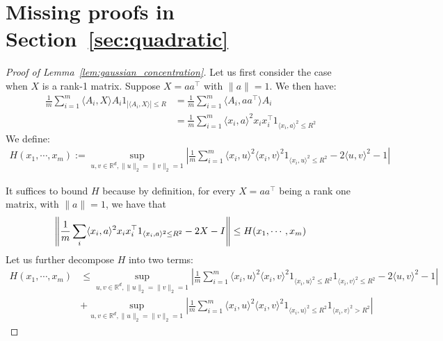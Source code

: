 \section{Missing proofs in Section~\ref{sec:quadratic}}\label{sec:proofs:q}
\begin{proof}[Proof of Lemma~\ref{lem:gaussian_concentration}]

Let us first consider the case when $X$ is a rank-1 matrix.  Suppose $X  = aa^{\top}$  with $\| a \|= 1$. We then have:
\begin{align}
\frac{1}{m} \sum_{i = 1}^m \langle A_i, X \rangle  A_i 1_{|\langle A_i, X \rangle| \leq R}&= \frac{1}{m} \sum_{i = 1}^m \langle A_i, a a^{\top} \rangle A_i \nonumber
\\
&=  \frac{1}{m} \sum_{i = 1}^m\langle x_i, a \rangle^2  x_i x_i^{\top} 1_{\langle x_i, a \rangle^2 \leq R^2}\nonumber
\end{align}
We define: 
 \begin{align}
 H(x_1, \cdots, x_m) := \sup_{u, v \in \mathbb{R}^d, \| u \|_2=  \| v\|_2 = 1} \left| \frac{1}{m}\sum_{i = 1}^m \langle x_i, u \rangle^2 \langle x_i , v \rangle^2 1_{\langle x_i,u  \rangle^2 \leq R^2} - 2 \langle u, v \rangle^2  - 1\right|\nonumber
\end{align}


It suffices to bound $H$ because by definition, for every $X  = aa^{\top}$ being a rank one matrix, with $\| a \|= 1$, we have that  
\begin{align}
\left\|\frac{1}{m} \sum_i\langle x_i, a \rangle^2  x_i x_i^{\top} 1_{\langle x_i, a \rangle^2 \leq R^2} - 2X  - I\right\|\leq  H(x_1, \cdots, x_m) \nonumber
 \end{align}
Let us further decompose $H$ into two terms:
\begin{align}
H(x_1, \cdots, x_m) &\leq  \sup_{u, v \in \mathbb{R}^d, \| u \|_2=  \| v\|_2 = 1} \left| \frac{1}{m}\sum_{i = 1}^m\langle x_i, u \rangle^2 \langle x_i , v \rangle^2 1_{\langle x_i,u  \rangle^2 \leq R^2 } 1_{\langle x_i,v  \rangle^2 \leq R^2 } - 2 \langle u, v \rangle^2 - 1 \right|\nonumber
\\
& + \sup_{u, v \in \mathbb{R}^d, \| u \|_2=  \| v\|_2 = 1} \left| \frac{1}{m}\sum_{i = 1}^m \langle x_i, u \rangle^2 \langle x_i , v \rangle^2   1_{\langle x_i,u  \rangle^2 \leq R^2} 1_{\langle x_i,v  \rangle^2 > R^2 }  \right|\label{eqn:split}
\end{align}
 

\end{proof}

